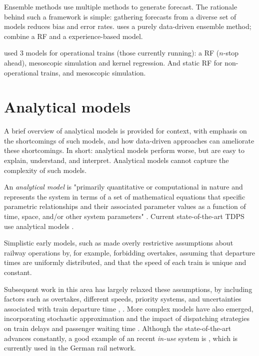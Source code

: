 \documentclass{article}
\begin{document}
Ensemble methods use multiple methods to generate forecast. The rationale behind such a framework is simple: gathering forecasts from a diverse set of models reduces bias and error rates. \cite{nair_et_al_2019} uses a purely data-driven ensemble method; \cite{oneto_et_al_2018} combine a RF and a experience-based model.

\cite{nair_et_al_2019} used 3 models for operational trains (those currently running): a RF ($n$-stop ahead), mesoscopic simulation and kernel regression.
And static RF for non-operational trains, and mesoscopic simulation.

\clearpage
\section{Analytical models}

A brief overview of analytical models is provided for context, with emphasis on the shortcomings of such models, and how data-driven approaches can ameliorate these shortcomings. In short: analytical models
perform worse, but are easy to explain, understand, and interpret. Analytical models cannot capture the complexity of such models. 

An \textit{analytical model} is "primarily quantitative or computational in nature and represents the system in terms of a set of mathematical equations that specific parametric relationships and their associated
parameter values as a function of time, space, and/or other system parameters" \cite{friedenthal_moore_steiner_2012}. Current state-of-the-art TDPS use analytical models \cite{oneto_fumeo_clerico_canepa_papa_dambra_mazzino_anguita_2016}.

Simplistic early models, such as \cite{frank_1966} made overly restrictive assumptions about railway operations by, for example, forbidding overtakes, assuming that departure times are uniformly distributed,
and that the speed of each train is unique and constant. 

Subsequent work in this area has largely relaxed these assumptions, by including factors such as overtakes, different speeds, priority systems, and uncertainties associated with train departure time \cite{petersen_1974}, \cite{chen_harker_1990}. More complex models have also emerged, incorporating stochastic approximation \cite{carey_kwiecinski_1994} and the impact of dispatching strategies on train delays
and passenger waiting time \cite{ozekici_sengor_1994}. Although the state-of-the-art advances constantly, a good example of an recent \textit{in-use} system is \cite{berger_et_al_2011}, which is currently used in the German rail network.
\end{document}
